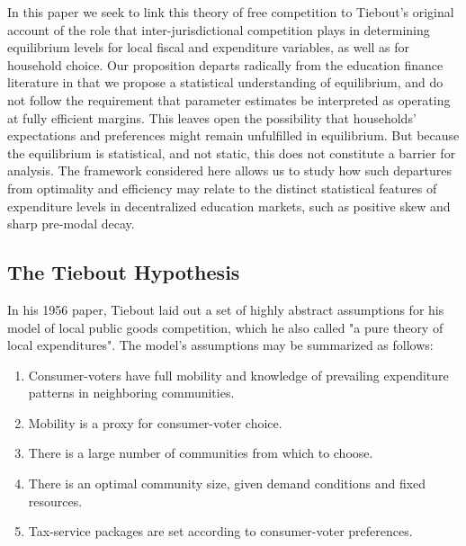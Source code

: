 In this paper we seek to link this theory of free competition to
Tiebout's original account of the role that inter-jurisdictional
competition plays in determining equilibrium levels for local fiscal
and expenditure variables, as well as for household choice.  Our
proposition departs radically from the education finance literature in
that we propose a statistical understanding of equilibrium, and do not
follow the requirement that parameter estimates be interpreted as
operating at fully efficient margins. This leaves open the possibility
that households' expectations and preferences might remain unfulfilled
in equilibrium. But because the equilibrium is statistical, and not
static, this does not constitute a barrier for analysis. The framework
considered here allows us to study how such departures from optimality
and efficiency may relate to the distinct statistical features of
expenditure levels in decentralized education markets, such as
positive skew and sharp pre-modal decay. 

\subsection{The Tiebout Hypothesis}
\label{sec-3-2}

In his 1956 paper, Tiebout laid out a set of highly abstract
assumptions for his model of local public goods competition, which he
also called "a pure theory of local expenditures". The model's
assumptions may be summarized as follows:

\begin{enumerate}
\item Consumer-voters have full mobility and knowledge of prevailing
expenditure patterns in neighboring communities.  \item Mobility is a
proxy for consumer-voter choice.  \item There is a large number of
communities from which to choose.  \item There is an optimal community
size, given demand conditions and fixed resources.  \item Tax-service
packages are set according to consumer-voter preferences.
\end{enumerate}


